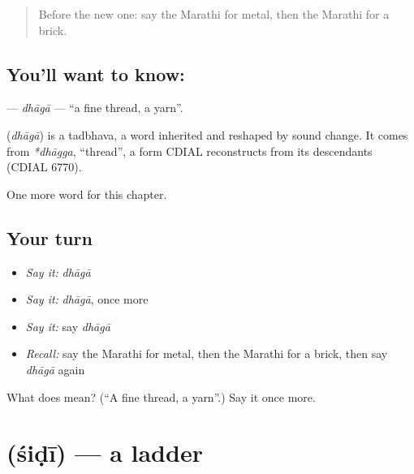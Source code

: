 \label{lesson:MR-C242-dhaga}



\begin{quote}
Before the new one: say the Marathi for metal, then the Marathi for a brick.
\end{quote}

\subsection*{You'll want to know: }
\textbf{} — \emph{dhāgā} — \textquotedblleft{}a fine thread, a yarn\textquotedblright{}.

\begin{cousinweb}
\textbf{} (\emph{dhāgā}) is a tadbhava, a word inherited and reshaped by sound change. It comes from \emph{*dhāgga}, \textquotedblleft{}thread\textquotedblright{}, a form CDIAL reconstructs from its descendants (CDIAL 6770).
\end{cousinweb}

\begin{grammarlens}[title={What you've built}]
One more word for this chapter.
\end{grammarlens}

\subsection*{Your turn}
\begin{itemize}
\raggedright
  \item \emph{Say it:} \emph{dhāgā}
  \item \emph{Say it:} \emph{dhāgā}, once more
  \item \emph{Say it:} say \emph{dhāgā}
  \item \emph{Recall:} say the Marathi for metal, then the Marathi for a brick, then say \emph{dhāgā} again
\end{itemize}

\begin{tcolorbox}[breakable,colback=teal!4,colframe=teal!35!black,title={Before you move on}]
What does  mean? (\textquotedblleft{}A fine thread, a yarn\textquotedblright{}.) Say it once more.
\end{tcolorbox}
\section[\texorpdfstring{\mr{शिडी} (śiḍī)}{शिडी (śiḍī)}]{ (śiḍī) — a ladder}

